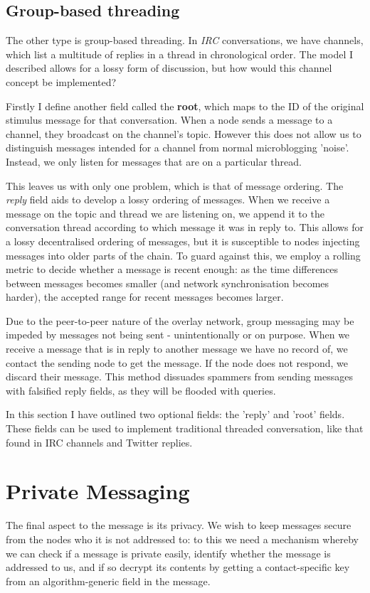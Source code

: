\documentclass[10pt,a4paper,onecolumn]{article}
\begin{document}
\subsection*{Group-based threading}
The other type is group-based threading. In \textit{IRC} conversations, we have channels, which list a multitude of replies in a thread in chronological order. The model I described allows for a lossy form of discussion, but how would this channel concept be implemented? 

Firstly I define another field called the \textbf{root}, which maps to the ID of the original stimulus message for that conversation. When a node sends a message to a channel, they broadcast on the channel's topic. However this does not allow us to distinguish messages intended for a channel from normal microblogging 'noise'. Instead, we only listen for messages that are on a particular thread. 

This leaves us with only one problem, which is that of message ordering. The \emph{reply} field aids to develop a lossy ordering of messages. When we receive a message on the topic and thread we are listening on, we append it to the conversation thread according to which message it was in reply to. This allows for a lossy decentralised ordering of messages, but it is susceptible to nodes injecting messages into older parts of the chain. To guard against this, we employ a rolling metric to decide whether a message is recent enough: as the time differences between messages becomes smaller (and network synchronisation becomes harder), the accepted range for recent messages becomes larger. 

Due to the peer-to-peer nature of the overlay network, group messaging may be impeded by messages not being sent - unintentionally or on purpose. When we receive a message that is in reply to another message we have no record of, we contact the sending node to get the message. If the node does not respond, we discard their message. This method dissuades spammers from sending messages with falsified reply fields, as they will be flooded with queries. 

In this section I have outlined two optional fields: the 'reply' and 'root' fields. These fields can be used to implement traditional threaded conversation, like that found in IRC channels and Twitter replies.

\section{Private Messaging}
The final aspect to the message is its privacy. We wish to keep messages secure from the nodes who it is not addressed to: to this we need a mechanism whereby we can check if a message is private easily, identify whether the message is addressed to us, and if so decrypt its contents by getting a contact-specific key from an algorithm-generic  field in the message.
\end{document}
